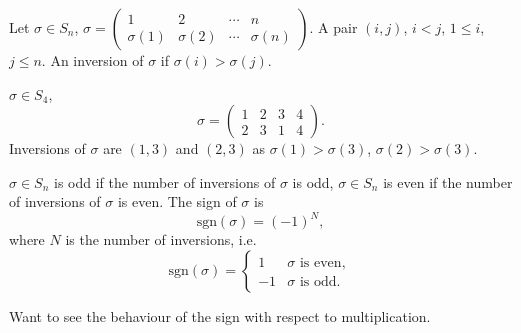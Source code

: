 \documentclass[10pt, a4paper]{article}
\begin{document}
\begin{definition}
    Let $\sigma \in S_n$,
    $\sigma = \begin{pmatrix}
        1 & 2 & \dotsi & n \\
        \sigma(1) & \sigma(2) & \dotsi & \sigma(n)
    \end{pmatrix}$.
    A pair $(i, j)$,
    $i < j$,
    $1 \leq i$,
    $j \leq n$.
    An inversion of $\sigma$ if $\sigma(i) > \sigma(j)$.
\end{definition}

\begin{example}
    $\sigma \in S_4$,
    \[
    \sigma = \begin{pmatrix}
        1 & 2 & 3 & 4 \\
        2 & 3 & 1 & 4
    \end{pmatrix}.
    \]
    Inversions of $\sigma$ are $(1, 3)$ and $(2, 3)$ as $\sigma(1) > \sigma(3)$,
    $\sigma(2) > \sigma(3)$.
\end{example}

\begin{definition}
    $\sigma \in S_n$ is odd if the number of inversions of $\sigma$ is odd,
    $\sigma \in S_n$ is even if the number of inversions of $\sigma$ is even.
    The sign of $\sigma$ is
    \[
    \mathrm{sgn}(\sigma) = (-1) ^ N,
    \]
    where $N$ is the number of inversions,
    i.e.
    \[
    \mathrm{sgn}(\sigma) = \begin{cases}
        1 & \sigma\text{ is even}, \\
        -1 & \sigma\text{ is odd}.
    \end{cases}
    \]
\end{definition}

Want to see the behaviour of the sign with respect to multiplication.
\end{document}
